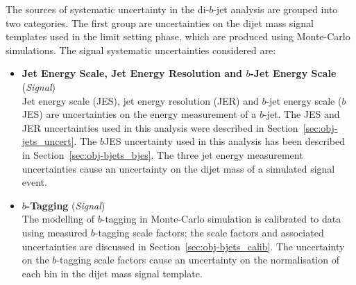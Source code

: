 The sources of systematic uncertainty in the di-$b$-jet analysis are grouped into two categories.
The first group are uncertainties on the dijet mass signal templates used in the limit setting phase, which are produced using Monte-Carlo simulations.
The signal systematic uncertainties considered are:
\vspace{-0.5em}
\begin{itemize}[leftmargin=*]
\item\textbf{Jet Energy Scale, Jet Energy Resolution  and $b$-Jet Energy Scale} \hspace{1mm} (\textit{Signal})\\
  Jet energy scale (JES), jet energy resolution (JER) and  $b$-jet energy scale ($b$JES) are uncertainties
  on the energy measurement of a $b$-jet.
  The JES and JER uncertainties used in this analysis were described in Section~\ref{sec:obj-jets_uncert}.
  The $b$JES uncertainty used in this analysis has been described in Section~\ref{sec:obj-bjets_bjes}.
  The three jet energy measurement uncertainties cause an uncertainty on the dijet mass of a simulated signal event.\vspace{0.5em}
\item\textbf{$b$-Tagging} \hspace{1mm} (\textit{Signal})\\
  The modelling of $b$-tagging in Monte-Carlo simulation is calibrated to data using measured $b$-tagging scale factors;
  the scale factors and associated uncertainties are discussed in Section~\ref{sec:obj-bjets_calib}.
  The uncertainty on the $b$-tagging scale factors cause an uncertainty on the normalisation of each bin in the dijet mass signal template.
  \vspace{0.5em}


\end{itemize}
